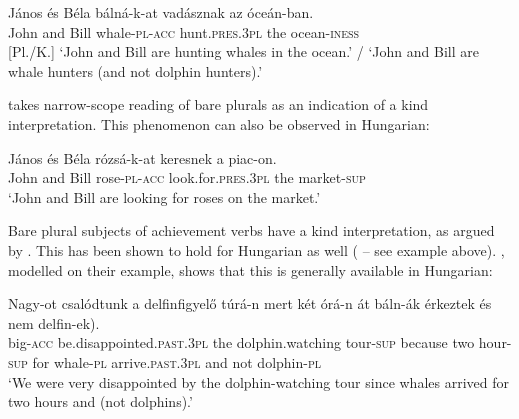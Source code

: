 \documentclass[output=paper]{langscibook}
\begin{document}

\ex \label{schv-nem:ex:40}
\gll János és Béla bálná-k-at vadásznak az óceán-ban.	\\
John and Bill whale-\textsc{pl}-\textsc{acc} hunt.\textsc{pres}.\textsc{3pl} the ocean-\textsc{iness}\\ \hfill [Pl./K.]
\glt `John and Bill are hunting whales in the ocean.' / `John and Bill are whale hunters (and not dolphin hunters).'
\z


\noindent \citet{carlson-77} takes narrow-scope reading of bare plurals as an indication of a kind interpretation. This phenomenon can also be observed in Hungarian:  

\ea \label{schv-nem:ex:41}
\gll János és Béla rózsá-k-at keresnek a piac-on.\\
John and Bill rose-\textsc{pl}-\textsc{acc} look.for.\textsc{pres}.\textsc{3pl} the market-\textsc{sup}\\
\glt `John and Bill are looking for roses on the market.' \\\hfill \citep[p. 203, (13)]{schvarcz-rothstein-17}
\z

\noindent Bare plural subjects of achievement verbs have a kind interpretation, as argued by \citet{landman-rothstein-10}. This has been shown to hold for Hungarian as well (\citealt{schvarcz-rothstein-17} -- see example  above). , modelled on their example, shows that this is generally available in Hungarian:

\ea \label{schv-nem:ex:42}
\gll Nagy-ot csalódtunk a delfinfigyelő túrá-n mert két órá-n át báln-ák érkeztek \minsp{(} és nem delfin-ek).\\
big-\textsc{acc} be.disappointed.\textsc{past}.\textsc{3pl} the dolphin.watching tour-\textsc{sup} because two hour-\textsc{sup} for  whale-\textsc{pl}  arrive.\textsc{past}.\textsc{3pl} {} and not dolphin-\textsc{pl}\\
\glt `We were very disappointed by the dolphin-watching tour since whales arrived for two hours and (not dolphins).'  
\z
\end{document}
